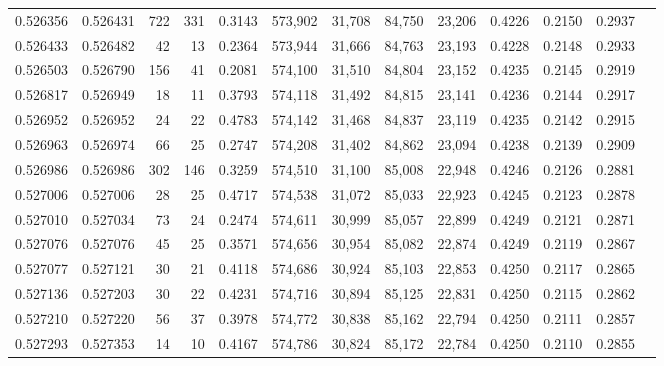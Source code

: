 \begin{tabular}{rrrrrrrrrrrrr}
0.526356 & 0.526431 &   722 &   331 &                                     0.3143 & 573,902 &  31,708 &  84,750 &  23,206 & 0.4226 & 0.2150 & 0.2937 \\
0.526433 & 0.526482 &    42 &    13 &                                     0.2364 & 573,944 &  31,666 &  84,763 &  23,193 & 0.4228 & 0.2148 & 0.2933 \\
0.526503 & 0.526790 &   156 &    41 &                                     0.2081 & 574,100 &  31,510 &  84,804 &  23,152 & 0.4235 & 0.2145 & 0.2919 \\
0.526817 & 0.526949 &    18 &    11 &                                     0.3793 & 574,118 &  31,492 &  84,815 &  23,141 & 0.4236 & 0.2144 & 0.2917 \\
0.526952 & 0.526952 &    24 &    22 &                                     0.4783 & 574,142 &  31,468 &  84,837 &  23,119 & 0.4235 & 0.2142 & 0.2915 \\
0.526963 & 0.526974 &    66 &    25 &                                     0.2747 & 574,208 &  31,402 &  84,862 &  23,094 & 0.4238 & 0.2139 & 0.2909 \\
0.526986 & 0.526986 &   302 &   146 &                                     0.3259 & 574,510 &  31,100 &  85,008 &  22,948 & 0.4246 & 0.2126 & 0.2881 \\
0.527006 & 0.527006 &    28 &    25 &                                     0.4717 & 574,538 &  31,072 &  85,033 &  22,923 & 0.4245 & 0.2123 & 0.2878 \\
0.527010 & 0.527034 &    73 &    24 &                                     0.2474 & 574,611 &  30,999 &  85,057 &  22,899 & 0.4249 & 0.2121 & 0.2871 \\
0.527076 & 0.527076 &    45 &    25 &                                     0.3571 & 574,656 &  30,954 &  85,082 &  22,874 & 0.4249 & 0.2119 & 0.2867 \\
0.527077 & 0.527121 &    30 &    21 &                                     0.4118 & 574,686 &  30,924 &  85,103 &  22,853 & 0.4250 & 0.2117 & 0.2865 \\
0.527136 & 0.527203 &    30 &    22 &                                     0.4231 & 574,716 &  30,894 &  85,125 &  22,831 & 0.4250 & 0.2115 & 0.2862 \\
0.527210 & 0.527220 &    56 &    37 &                                     0.3978 & 574,772 &  30,838 &  85,162 &  22,794 & 0.4250 & 0.2111 & 0.2857 \\
0.527293 & 0.527353 &    14 &    10 &                                     0.4167 & 574,786 &  30,824 &  85,172 &  22,784 & 0.4250 & 0.2110 & 0.2855 \\

\end{tabular}
